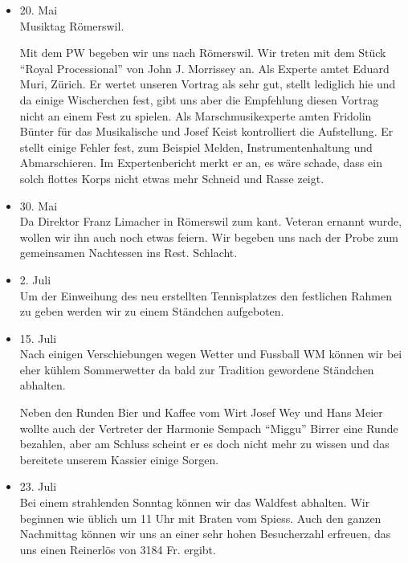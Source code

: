 \begin{history}
\begin{itemize}
        \item[]20. Mai\\
        Musiktag Römerswil.

        Mit dem PW begeben wir uns nach Römerswil. Wir
        treten mit dem Stück \enquote{Royal Processional} von John J. Morrissey an.
        Als Experte amtet Eduard Muri, Zürich. Er wertet unseren Vortrag als
        sehr gut, stellt lediglich hie und da einige Wischerchen fest, gibt uns
        aber die Empfehlung diesen Vortrag nicht an einem Fest zu spielen. Als
        Marschmusikexperte amten Fridolin Bünter für das Musikalische und Josef
        Keist kontrolliert die Aufstellung. Er stellt einige Fehler fest, zum
        Beispiel Melden, Instrumentenhaltung und Abmarschieren. Im
        Expertenbericht merkt er an, es wäre schade, dass ein solch flottes
        Korps nicht etwas mehr Schneid und Rasse zeigt.

        \item[]30. Mai\\
        Da Direktor Franz Limacher in Römerswil zum kant. Veteran ernannt wurde,
        wollen wir ihn auch noch etwas feiern. Wir begeben uns nach der Probe
        zum gemeinsamen Nachtessen ins Rest. Schlacht.

        \item[]2. Juli\\
        Um der Einweihung des neu erstellten Tennisplatzes den festlichen Rahmen
        zu geben werden wir zu einem Ständchen aufgeboten.

        \item[]15. Juli\\
        Nach einigen Verschiebungen wegen Wetter und Fussball WM können wir bei
        eher kühlem Sommerwetter da bald zur Tradition gewordene Ständchen
        abhalten.

        Neben den Runden Bier und Kaffee vom Wirt Josef Wey und Hans Meier
        wollte auch der Vertreter der Harmonie Sempach \enquote{Miggu} Birrer eine
        Runde bezahlen, aber am Schluss scheint er es doch nicht mehr zu wissen
        und das bereitete unserem Kassier einige Sorgen.

        \item[]23. Juli\\
        Bei einem strahlenden Sonntag können wir das Waldfest abhalten. Wir
        beginnen wie üblich um 11 Uhr mit Braten vom Spiess. Auch den ganzen
        Nachmittag können wir uns an einer sehr hohen Besucherzahl erfreuen, das
        uns einen Reinerlös von 3184 Fr. ergibt.


\end{itemize}
\end{history}
